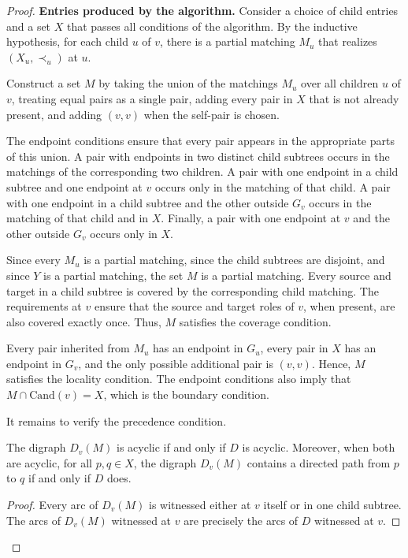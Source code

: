 \documentclass[a4paper,USenglish,thm-restate]{lipics-v2021}
\newcommand{\cand}{\mathrm{Cand}}
\theoremstyle{problemstyle}
\begin{document}
\begin{proof}
\smallskip
\noindent\textbf{Entries produced by the algorithm.}
Consider a choice of child entries and a set $X$ that passes all conditions of the algorithm. By the inductive hypothesis, for each child $u$ of $v$, there is a partial matching $M_u$ that realizes $(X_u,\prec_u)$ at $u$.
 
Construct a set $M$ by taking the union of the matchings $M_u$ over all children $u$ of $v$, treating equal pairs as a single pair, adding every pair in $X$ that is not already present, and adding $(v,v)$ when the self-pair is chosen.
 
The endpoint conditions ensure that every pair appears in the appropriate parts of this union. A pair with endpoints in two distinct child subtrees occurs in the matchings of the corresponding two children. A pair with one endpoint in a child subtree and one endpoint at $v$ occurs only in the matching of that child. A pair with one endpoint in a child subtree and the other outside $G_v$ occurs in the matching of that child and in $X$. Finally, a pair with one endpoint at $v$ and the other outside $G_v$ occurs only in $X$.
 
Since every $M_u$ is a partial matching, since the child subtrees are disjoint, and since $Y$ is a partial matching, the set $M$ is a partial matching. Every source and target in a child subtree is covered by the corresponding child matching. The requirements at $v$ ensure that the source and target roles of $v$, when present, are also covered exactly once. Thus, $M$ satisfies the coverage condition.
 
Every pair inherited from $M_u$ has an endpoint in $G_u$, every pair in $X$ has an endpoint in $G_v$, and the only possible additional pair is $(v,v)$. Hence, $M$ satisfies the locality condition. The endpoint conditions also imply that $M\cap\cand(v)=X$, which is the boundary condition.
 
It remains to verify the precedence condition.
 
\begin{claim}\label{clm:prec-cstr}
The digraph $D_v(M)$ is acyclic if and only if $D$ is acyclic. Moreover, when both are acyclic, for all $p,q\in X$, the digraph $D_v(M)$ contains a directed path from $p$ to $q$ if and only if $D$ does.
\end{claim}
 
\begin{proof}
Every arc of $D_v(M)$ is witnessed either at $v$ itself or in one child subtree. The arcs of $D_v(M)$ witnessed at $v$ are precisely the arcs of $D$ witnessed at $v$.
 

\end{proof}
\end{proof}
\end{document}
